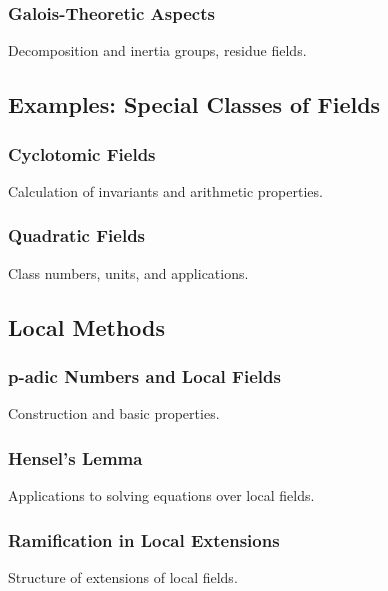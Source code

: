 \documentclass[12pt]{article}
\begin{document}
\subsubsection{Galois-Theoretic Aspects}
Decomposition and inertia groups, residue fields.

\subsection{Examples: Special Classes of Fields}
\subsubsection{Cyclotomic Fields}
Calculation of invariants and arithmetic properties.

\subsubsection{Quadratic Fields}
Class numbers, units, and applications.

\subsection{Local Methods}
\subsubsection{p-adic Numbers and Local Fields}
Construction and basic properties.

\subsubsection{Hensel's Lemma}
Applications to solving equations over local fields.

\subsubsection{Ramification in Local Extensions}
Structure of extensions of local fields.
\end{document}
